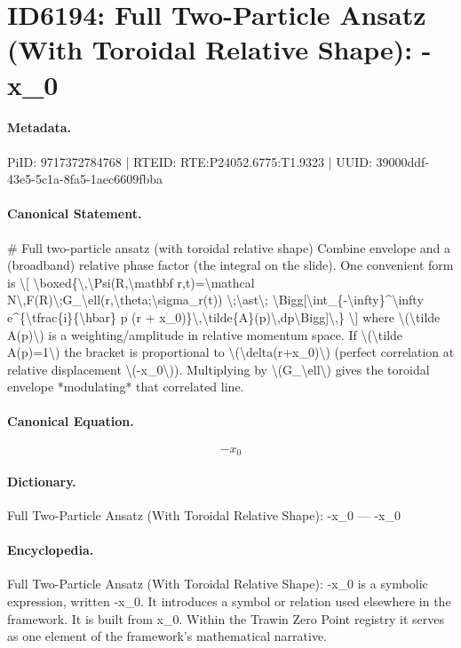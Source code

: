\section*{ID6194: Full Two-Particle Ansatz (With Toroidal Relative Shape): -x\_0}
\paragraph{Metadata.}
PiID: 9717372784768 | RTEID: RTE:P24052.6775:T1.9323 | UUID: 39000ddf-43e5-5c1a-8fa5-1aec6609fbba

\paragraph{Canonical Statement.}
\# Full two-particle ansatz (with toroidal relative shape) Combine envelope and a (broadband) relative phase factor (the integral on the slide). One convenient form is \textbackslash{}[ \textbackslash{}boxed\{\textbackslash{},\textbackslash{}Psi(R,\textbackslash{}mathbf r,t)=\textbackslash{}mathcal N\textbackslash{},F(R)\textbackslash{};G\_\textbackslash{}ell(r,\textbackslash{}theta;\textbackslash{}sigma\_r(t)) \textbackslash{};\textbackslash{}ast\textbackslash{}; \textbackslash{}Bigg[\textbackslash{}int\_\{-\textbackslash{}infty\}\textasciicircum{}\textbackslash{}infty e\textasciicircum{}\{\textbackslash{}tfrac\{i\}\{\textbackslash{}hbar\} p (r + x\_0)\}\textbackslash{},\textbackslash{}tilde\{A\}(p)\textbackslash{},dp\textbackslash{}Bigg]\textbackslash{},\} \textbackslash{}] where \textbackslash{}(\textbackslash{}tilde A(p)\textbackslash{}) is a weighting/amplitude in relative momentum space. If \textbackslash{}(\textbackslash{}tilde A(p)=1\textbackslash{}) the bracket is proportional to \textbackslash{}(\textbackslash{}delta(r+x\_0)\textbackslash{}) (perfect correlation at relative displacement \textbackslash{}(-x\_0\textbackslash{})). Multiplying by \textbackslash{}(G\_\textbackslash{}ell\textbackslash{}) gives the toroidal envelope *modulating* that correlated line.

\paragraph{Canonical Equation.}
\[
-x_0
\]

\paragraph{Dictionary.}
Full Two-Particle Ansatz (With Toroidal Relative Shape): -x\_0 — -x\_0

\paragraph{Encyclopedia.}
Full Two-Particle Ansatz (With Toroidal Relative Shape): -x\_0 is a symbolic expression, written -x\_0. It introduces a symbol or relation used elsewhere in the framework. It is built from x\_0. Within the Trawin Zero Point registry it serves as one element of the framework's mathematical narrative.
